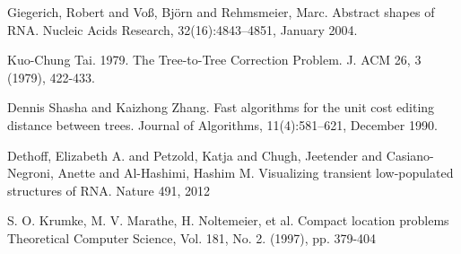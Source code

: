 \documentclass[10pt,letterpaper]{article}
\begin{document}
\begin{thebibliography}{10}
Giegerich, Robert and Vo{\ss}, Bj\"{o}rn and Rehmsmeier, Marc. Abstract shapes
    of RNA. Nucleic Acids Research, 32(16):4843–4851, January 2004.

Kuo-Chung Tai. 1979. The Tree-to-Tree Correction Problem. J. ACM 26, 3 (1979), 422-433.



Dennis Shasha and Kaizhong Zhang. Fast algorithms for the unit cost
    editing distance between trees. Journal of Algorithms, 11(4):581–621,
    December 1990.

Dethoff, Elizabeth A. and Petzold, Katja and Chugh, Jeetender and Casiano-Negroni, Anette and Al-Hashimi, Hashim M. Visualizing transient low-populated structures of RNA. Nature 491, 2012

 S. O. Krumke, M. V. Marathe, H. Noltemeier, et al. Compact location problems Theoretical Computer Science, Vol. 181, No. 2. (1997), pp. 379-404
\end{thebibliography}
\end{document}
